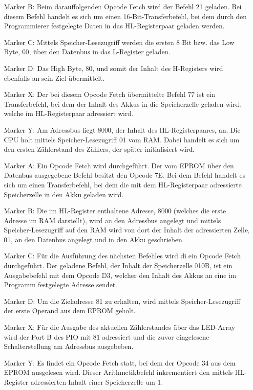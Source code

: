 Marker B: Beim darauffolgenden Opcode Fetch wird der Befehl 21 geladen. Bei diesem Befehl handelt es sich um einen 16-Bit-Transferbefehl, bei dem durch den Programmierer festgelegte Daten in das HL-Registerpaar geladen werden.

Marker C: Mittels Speicher-Lesezugriff werden die ersten 8 Bit bzw. das Low Byte, 00, über den Datenbus in das L-Register geladen.

Marker D: Das High Byte, 80, und somit der Inhalt des H-Registers wird ebenfalls an sein Ziel übermittelt.

Marker X: Der bei diesem Opcode Fetch übermittelte Befehl 77 ist ein Transferbefehl, bei dem der Inhalt des Akkus in die Speicherzelle geladen wird, welche im HL-Registerpaar adressiert wird.

Marker Y: Am Adressbus liegt 8000, der Inhalt des HL-Registerpaares, an. Die CPU holt mittels Speicher-Lesezugriff 01 vom RAM. Dabei handelt es sich um den ersten Zählerstand des Zählers, der später initialisiert wird.

Marker A: Ein Opcode Fetch wird durchgeführt. Der vom EPROM über den Datenbus ausgegebene Befehl besitzt den Opcode 7E. Bei dem Befehl handelt es sich um einen Transferbefehl, bei dem die mit dem HL-Registerpaar adressierte Speicherzelle in den Akku geladen wird.

Marker B: Die im HL-Register enthaltene Adresse, 8000 (welches die erste Adresse im RAM darstellt), wird an den Adressbus angelegt und mittels Speicher-Lesezugriff auf den RAM wird von dort der Inhalt der adressierten Zelle, 01, an den Datenbus angelegt und in den Akku geschrieben.

Marker C: Für die Ausführung des nächsten Befehles wird di ein Opcode Fetch durchgeführt. Der geladene Befehl, der Inhalt der Speicherzelle 010B, ist ein Ausgabebefehl mit dem Opcode D3, welcher den Inhalt des Akkus an eine im Programm festgelegte Adresse sendet.

Marker D: Um die Zieladresse 81 zu erhalten, wird mittels Speicher-Lesezugriff der erste Operand aus dem EPROM geholt.

Marker X: Für die Ausgabe des aktuellen Zählerstandes über das LED-Array wird der Port B des PIO mit 81 adressiert und die zuvor eingelesene Schalterstellung am Adressbus ausgebeben.

Marker Y: Es findet ein Opcode Fetch statt, bei dem der Opcode 34 aus dem EPROM ausgelesen wird. Dieser Arithmetikbefehl inkrementiert den mittels HL-Register adressierten Inhalt einer Speicherzelle um 1.

